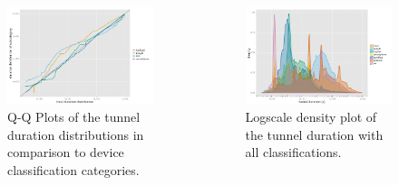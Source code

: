 \documentclass{beamer}
\begin{document}
\begin{frame}
	\begin{columns}[T]
		\begin{figure}
			\centering
			\includegraphics[width=\columnwidth]{../../chapters/041-mobilenetsmeasuring/images/R-duration-qq-category-comparison.pdf}
			\caption{Q-Q Plots of the tunnel duration distributions in comparison to device classification categories.}
		\end{figure}

		\begin{figure}
			\includegraphics[width=\columnwidth]{../../chapters/041-mobilenetsmeasuring/images/R-duration-classification-density.pdf}
			\caption{Logscale density plot of the tunnel duration with all classifications.}
		\end{figure}
	\end{columns}
\end{frame}
\end{document}
